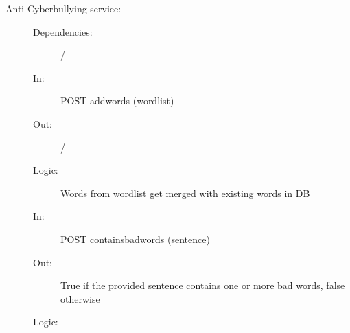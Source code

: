 \documentclass{article}
\begin{document}
\begin{description}
    \item [Anti-Cyberbullying service:]
    \begin{description}
        \item[]
        \item[Dependencies:] /
    \end{description}
    \begin{description}
        \item[]
        \item[In:] POST addwords (wordlist)
        \item[Out:] /
        \item[Logic:] Words from wordlist get merged with existing words in DB
        \item[]

        \item[In:] POST containsbadwords (sentence)
        \item[Out:] True if the provided sentence contains one or more bad words, false otherwise
        \item[Logic:]
    \end{description}
\end{description}
\end{document}

